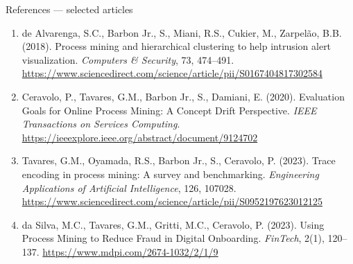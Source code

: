 \documentclass[aspectratio=169,11pt]{beamer}
\begin{document}
\begin{frame}[shrink=8]{References — selected articles}
  \small
  \begin{enumerate}
    \item de Alvarenga, S.C., Barbon Jr., S., Miani, R.S., Cukier, M.,
      Zarpelão, B.B. (2018). Process mining and hierarchical clustering to
      help intrusion alert visualization. \textit{Computers \& Security},
      73, 474--491.
      \url{https://www.sciencedirect.com/science/article/pii/S0167404817302584}

    \item Ceravolo, P., Tavares, G.M., Barbon Jr., S., Damiani, E. (2020).
      Evaluation Goals for Online Process Mining: A Concept Drift
      Perspective. \textit{IEEE Transactions on Services Computing}.
      \url{https://ieeexplore.ieee.org/abstract/document/9124702}

    \item Tavares, G.M., Oyamada, R.S., Barbon Jr., S., Ceravolo, P.
      (2023). Trace encoding in process mining: A survey and benchmarking.
      \textit{Engineering Applications of Artificial Intelligence}, 126,
      107028.
      \url{https://www.sciencedirect.com/science/article/pii/S0952197623012125}

    \item da Silva, M.C., Tavares, G.M., Gritti, M.C., Ceravolo, P.
      (2023). Using Process Mining to Reduce Fraud in Digital Onboarding.
      \textit{FinTech}, 2(1), 120--137.
      \url{https://www.mdpi.com/2674-1032/2/1/9}
  \end{enumerate}
\end{frame}
\end{document}

